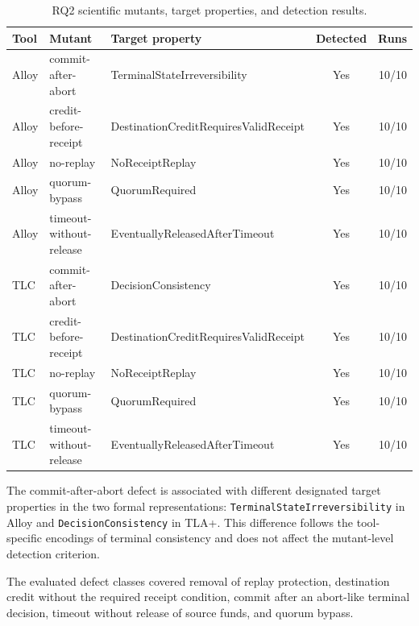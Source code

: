 \begin{table}[htbp]
\centering
\footnotesize
\setlength{\tabcolsep}{2pt}
\caption{RQ2 scientific mutants, target properties, and detection results.}
\label{tab:rq2-summary}
\begin{tabular}{lp{}p{}cr}
\hline
Tool & Mutant & Target property & Detected & Runs \\
\hline
Alloy &
commit-after-abort &
TerminalState\allowbreak Irreversibility &
Yes & 10/10 \\

Alloy &
credit-before-receipt &
DestinationCreditRequires\allowbreak ValidReceipt &
Yes & 10/10 \\

Alloy &
no-replay &
NoReceipt\allowbreak Replay &
Yes & 10/10 \\

Alloy &
quorum-bypass &
Quorum\allowbreak Required &
Yes & 10/10 \\

Alloy &
timeout-without-release &
EventuallyReleasedAfter\allowbreak Timeout &
Yes & 10/10 \\

TLC &
commit-after-abort &
Decision\allowbreak Consistency &
Yes & 10/10 \\

TLC &
credit-before-receipt &
DestinationCreditRequires\allowbreak ValidReceipt &
Yes & 10/10 \\

TLC &
no-replay &
NoReceipt\allowbreak Replay &
Yes & 10/10 \\

TLC &
quorum-bypass &
Quorum\allowbreak Required &
Yes & 10/10 \\

TLC &
timeout-without-release &
EventuallyReleasedAfter\allowbreak Timeout &
Yes & 10/10 \\
\hline
\end{tabular}
\end{table}

The commit-after-abort defect is associated with different designated
target properties in the two formal representations:
\texttt{TerminalState\allowbreak Irreversibility} in Alloy and
\texttt{Decision\allowbreak Consistency} in TLA+. This difference follows the
tool-specific encodings of terminal consistency and does not affect
the mutant-level detection criterion.

The evaluated defect classes covered removal of replay protection,
destination credit without the required receipt condition, commit after
an abort-like terminal decision, timeout without release of source
funds, and quorum bypass.

